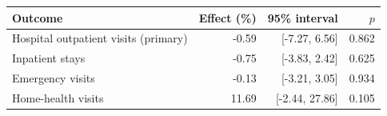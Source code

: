 \begin{tabular}{lrrr}\toprule
Outcome & Effect (\%) & 95\% interval & $p$\\\midrule
Hospital outpatient visits (primary) & -0.59 & [-7.27, 6.56] & 0.862 \\
Inpatient stays & -0.75 & [-3.83, 2.42] & 0.625 \\
Emergency visits & -0.13 & [-3.21, 3.05] & 0.934 \\
Home-health visits & 11.69 & [-2.44, 27.86] & 0.105 \\
\bottomrule\end{tabular}